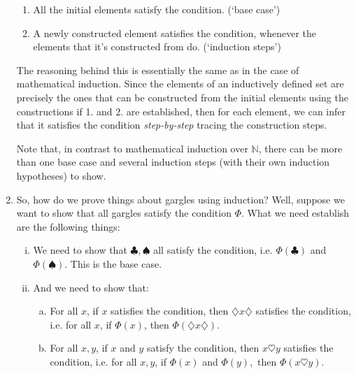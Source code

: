 \begin{enumerate}[{\thesection}.1]
\begin{enumerate}[1.]
			\item All the initial elements satisfy the condition. (`base case')
			
			\item A newly constructed element satisfies the condition, whenever the elements that it's constructed from do. (`induction steps')
		
		\end{enumerate}
		
		The reasoning behind this is essentially the same as in the case of mathematical induction. Since the elements of an inductively defined set are precisely the ones that can be constructed from the initial elements using the constructions if 1. and 2. are established, then for each element, we can infer that it satisfies the condition \emph{step-by-step} tracing the construction steps. 
		
		Note that, in contrast to mathematical induction over $\mathbb{N}$, there can be more than one base case and several induction steps (with their own induction hypotheses) to show.
				
		\item So, how do we prove things about gargles using induction? Well, suppose we want to show that all gargles satisfy the condition $\Phi$. What we need establish are the following things:
		
		\begin{enumerate}[(i)]
		
				\item We need to show that $\clubsuit,\spadesuit$ all satisfy the condition, i.e. $\Phi(\clubsuit)$ and $\Phi(\spadesuit)$. This is the base case.
				
				\item And we need to show that:
				
						\begin{enumerate}[(a)]
							
							\item For all $x$, if $x$ satisfies the condition, then $\diamondsuit x\diamondsuit$ satisfies the condition, i.e. for all $x$, if $\Phi(x)$, then $\Phi(\diamondsuit x\diamondsuit)$. 
							
							\item For all $x,y$, if $x$ and $y$ satisfy the condition, then $ x\heartsuit y$ satisfies the condition, i.e. for all $x,y$, if $\Phi(x)$ and $\Phi(y),$ then $\Phi( x\heartsuit y)$.

						\end{enumerate}
		

\end{enumerate}
\end{enumerate}
